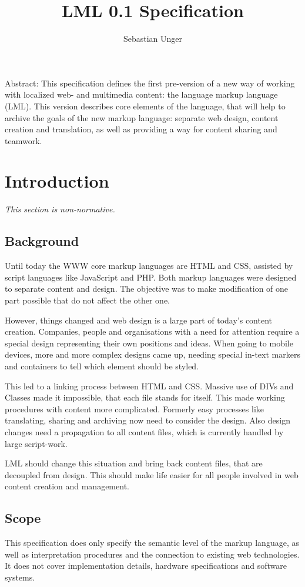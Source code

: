 \documentclass[12pt,a4paper]{article}
\author{Sebastian Unger}
\title{LML 0.1 Specification}
\begin{document}
\maketitle
Abstract: This specification defines the first pre-version of a new way of working with localized web- and multimedia content: the language markup language (LML). This version describes core elements of the language, that will help to archive the goals of the new markup language: separate web design, content creation and translation, as well as providing a way for content sharing and teamwork.
\tableofcontents
\newpage

\section{Introduction}
\begin{small}\textit{This section is non-normative.}\end{small}

\subsection{Background}
Until today the WWW core markup languages are HTML and CSS, assisted by script languages like JavaScript and PHP. Both markup languages were designed to separate content and design. The objective was to make modification of one part possible that do not affect the other one.

However, things changed and web design is a large part of today's content creation. Companies, people and organisations with a need for attention require a special design representing their own positions and ideas. When going to mobile devices, more and more complex designs came up, needing special in-text markers and containers to tell which element should be styled.

This led to a linking process between HTML and CSS. Massive use of DIVs and Classes made it impossible, that each file stands for itself. This made working procedures with content more complicated. Formerly easy processes like translating, sharing and archiving now need to consider the design. Also design changes need a propagation to all content files, which is currently handled by large script-work.

LML should change this situation and bring back content files, that are decoupled from design. This should make life easier for all people involved in web content creation and management.

\subsection{Scope}
This specification does only specify the semantic level of the markup language, as well as interpretation procedures and the connection to existing web technologies. It does not cover implementation details, hardware specifications and software systems.
\end{document}
